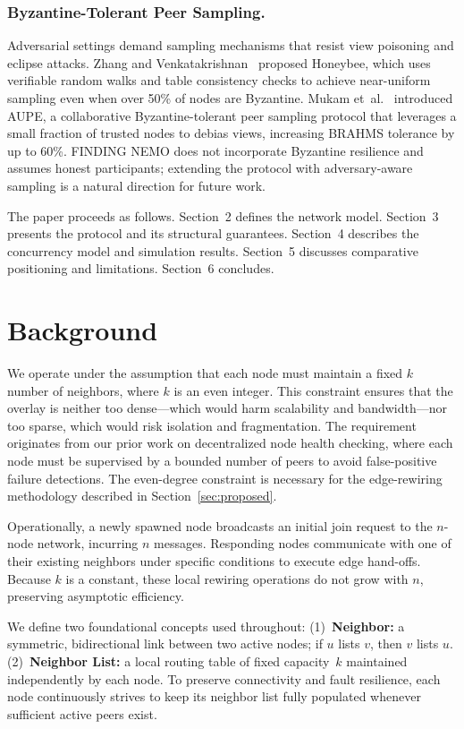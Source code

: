 \documentclass[runningheads]{llncs}
\begin{document}
\subsubsection{Byzantine-Tolerant Peer Sampling.}
Adversarial settings demand sampling mechanisms that resist view poisoning and eclipse attacks. Zhang and Venkatakrishnan~\cite{zhangHoneybeeByzantineTolerant2025} proposed Honeybee, which uses verifiable random walks and table consistency checks to achieve near-uniform sampling even when over 50\% of nodes are Byzantine. Mukam et~al.~\cite{mukamAUPECollaborativeByzantine} introduced AUPE, a collaborative Byzantine-tolerant peer sampling protocol that leverages a small fraction of trusted nodes to debias views, increasing BRAHMS tolerance by up to 60\%. FINDING NEMO does not incorporate Byzantine resilience and assumes honest participants; extending the protocol with adversary-aware sampling is a natural direction for future work.

The paper proceeds as follows. Section~2 defines the network model. Section~3 presents the protocol and its structural guarantees. Section~4 describes the concurrency model and simulation results. Section~5 discusses comparative positioning and limitations. Section~6 concludes.

\section{Background}
\label{sec:background}
We operate under the assumption that each node must maintain a fixed $k$ number of neighbors, where $k$ is an even integer. This constraint ensures that the overlay is neither too dense---which would harm scalability and bandwidth---nor too sparse, which would risk isolation and fragmentation. The requirement originates from our prior work on decentralized node health checking, where each node must be supervised by a bounded number of peers to avoid false-positive failure detections. The even-degree constraint is necessary for the edge-rewiring methodology described in Section~\ref{sec:proposed}.

Operationally, a newly spawned node broadcasts an initial join request to the $n$-node network, incurring $n$ messages. Responding nodes communicate with one of their existing neighbors under specific conditions to execute edge hand-offs. Because $k$ is a constant, these local rewiring operations do not grow with $n$, preserving asymptotic efficiency.

We define two foundational concepts used throughout:
(1)~\textbf{Neighbor:} a symmetric, bidirectional link between two active nodes; if $u$ lists $v$, then $v$ lists $u$.
(2)~\textbf{Neighbor List:} a local routing table of fixed capacity~$k$ maintained independently by each node. To preserve connectivity and fault resilience, each node continuously strives to keep its neighbor list fully populated whenever sufficient active peers exist.
\end{document}

